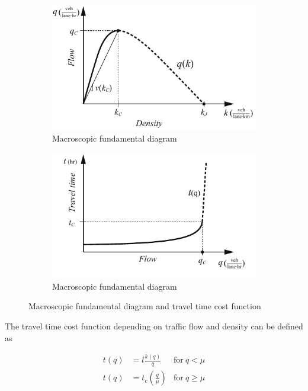 \documentclass{article}
\begin{document}
\begin{figure}[!ht]
     \centering
     \hfill
     \begin{subfigure}[b]{0.4\textwidth}
         \centering
         \includegraphics[width=\textwidth]{diagram_mfd}
         \caption{Macroscopic fundamental diagram}
         \label{fig:mfd}
     \end{subfigure}
     \hfill
     \begin{subfigure}[b]{0.4\textwidth}
         \centering
         \includegraphics[width=\textwidth]{diagram_traveltime}
        \caption{Macroscopic fundamental diagram}
         \label{fig:traveltime}
     \end{subfigure}
     \hfill
     \caption{Macroscopic fundamental diagram and travel time cost function}
\end{figure}

The travel time cost function depending on traffic flow and density can be defined as

\begin{align}
    t(q) &= l \frac{k(q)}{q} & \text{for}~q < \mu \\
    t(q) &= t_c (\frac{q}{\mu})  & \text{for}~q \geq \mu
\end{align}
\end{document}
